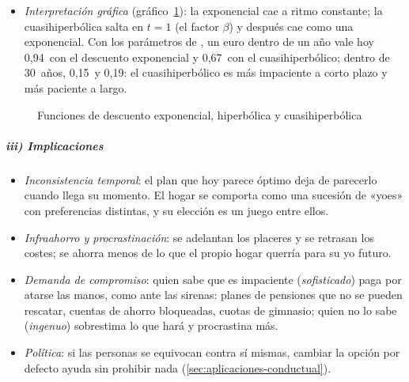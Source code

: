 \documentclass[11pt]{article}
\begin{document}
\begin{itemize}
\begin{itemize}
  \item \emph{al llegar la semana 52}, la elección vuelve a ser la de hoy y se cogen los 100: el plan se incumple sin que haya llegado ninguna información nueva.
  \end{itemize}
\item \emph{Interpretación gráfica} (gráfico~\ref{fig:descuento}): la exponencial cae a ritmo constante; la cuasihiperbólica salta en $t=1$ (el factor $\beta$) y después cae como una exponencial. Con los parámetros de \textcite{AngeletosEtAl2001Hyperbolic}, un euro dentro de un año vale hoy 0,94~con el descuento exponencial y 0,67~con el cuasihiperbólico; dentro de 30~años, 0,15~y 0,19: el cuasihiperbólico es más impaciente a corto plazo y más paciente a largo.
\end{itemize}

\begin{figure}[H]
\centering
\caption{Funciones de descuento exponencial, hiperbólica y cuasihiperbólica}\label{fig:descuento}
\end{figure}

\subparagraph{iii) Implicaciones}

\begin{itemize}
\item \emph{Inconsistencia temporal}: el plan que hoy parece óptimo deja de parecerlo cuando llega su momento. El hogar se comporta como una sucesión de «yoes» con preferencias distintas, y su elección es un juego entre ellos.
\item \emph{Infraahorro y procrastinación}: se adelantan los placeres y se retrasan los costes; se ahorra menos de lo que el propio hogar querría para su yo futuro.
\item \emph{Demanda de compromiso}: quien sabe que es impaciente (\emph{sofisticado}) paga por atarse las manos, como  ante las sirenas: planes de pensiones que no se pueden rescatar, cuentas de ahorro bloqueadas, cuotas de gimnasio; quien no lo sabe (\emph{ingenuo}) sobrestima lo que hará y procrastina más\nocite{ODonoghueRabin1999Doing}.
\item \emph{Política}: si las personas se equivocan contra sí mismas, cambiar la opción por defecto ayuda sin prohibir nada (\ref{sec:aplicaciones-conductual}).
\end{itemize}
\end{document}

